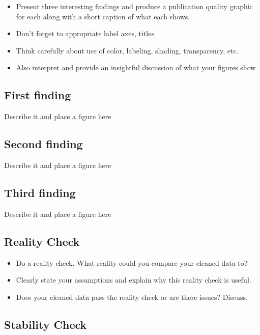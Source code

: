 \documentclass[11pt,letterpaper]{article}
\begin{document}
\begin{itemize}
\item Present three interesting findings and produce a publication quality graphic for each along with a short caption of what each shows.
\item Don't forget to appropriate label axes, titles
\item Think carefully about use of color, labeling, shading, transparency, etc.
\item Also interpret and provide an insightful discussion of what your figures show
\end{itemize}

\subsection{First finding}\label{first-finding}

Describe it and place a figure here

\subsection{Second finding}\label{second-finding}

Describe it and place a figure here

\subsection{Third finding}\label{third-finding}

Describe it and place a figure here

\subsection{Reality Check}\label{reality-check}

\begin{itemize}
\item Do a reality check. What reality could you compare your cleaned data to?
\item Clearly state your assumptions and explain why this reality check is useful.
\item Does your cleaned data pass the reality check or are there issues? Discuss.
\end{itemize}

\subsection{Stability Check}\label{stability-check}
\end{document}
